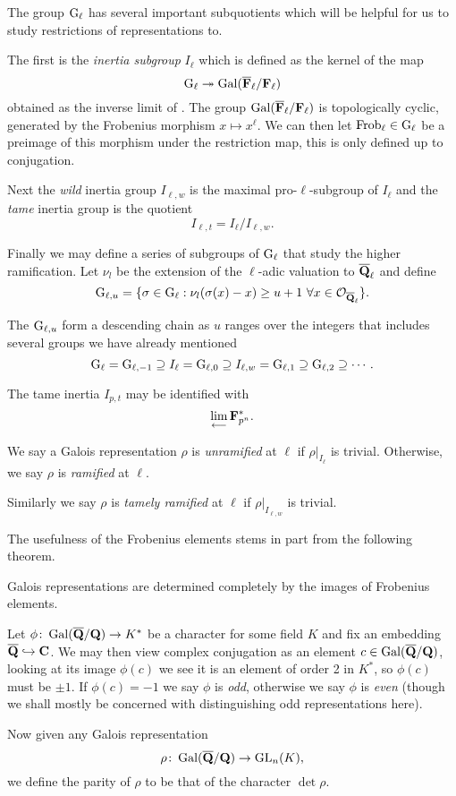 \documentclass[a4paper,12pt]{article}
\begin{document}
The group $\mathrm{G}_\ell$ has several important subquotients which will be helpful for us to study restrictions of representations to.
\begin{defn}\label{def:inert}
The first is the \emph{inertia subgroup} $I_\ell$ which is defined as the kernel of the map
\[
\mathrm{G}_\ell \twoheadrightarrow \operatorname{Gal}(\overline{\mathbf{F}}_\ell/\mathbf{F}_\ell)
\]
obtained as the inverse limit of . %
The group $\operatorname{Gal}(\overline{\mathbf{F}}_\ell/\mathbf{F}_\ell)$ is topologically cyclic, generated by the Frobenius morphism $x \mapsto x^\ell$.
We can then let $\operatorname{Frob}_\ell\in \mathrm{G}_\ell$ be a preimage of this morphism under the restriction map, this is only defined up to conjugation.


Next the \emph{wild} inertia group $I_{\ell,w}$ is the maximal pro-$\ell$-subgroup of $I_\ell$ and the \emph{tame} inertia group is the quotient
\[
I_{\ell,t} = I_\ell / I_{\ell,w}.
\]

Finally we may define a series of subgroups of $\mathrm{G}_\ell$ that study the higher ramification.
Let $\nu_l$ be the extension of the $\ell$-adic valuation to $\overline{\mathbf{Q}}_\ell$ and define
\[
\mathrm{G}_{\ell,u} = \{\sigma \in \mathrm{G}_\ell : \nu_l(\sigma(x) - x) \ge u + 1\ \forall x \in \mathcal{O}_{\overline{\mathbf{Q}}_\ell} \}.
\]
\end{defn}

The $\mathrm{G}_{\ell,u}$ form a descending chain as $u$ ranges over the integers that includes several groups we have already mentioned
\[
\mathrm{G}_\ell = \mathrm{G}_{\ell,-1} \supseteq I_\ell = \mathrm{G}_{\ell,0} \supseteq  I_{\ell,w} = \mathrm{G}_{\ell,1} \supseteq\mathrm{G}_{\ell, 2}\supseteq\cdots.
\]

The tame inertia $I_{p,t}$ may be identified with
\[
\lim_{\longleftarrow} \mathbf{F}_{p^n}^*.
\] %

\begin{defn}
We say a Galois representation $\rho$ is \emph{unramified} at $\ell$ if $\rho|_{I_\ell}$ is trivial.
Otherwise, we say $\rho$ is \emph{ramified} at $\ell$.

Similarly we say $\rho$ is \emph{tamely ramified} at $\ell$ if $\rho|_{I_{\ell,w}}$ is trivial.
\end{defn}

The usefulness of the Frobenius elements stems in part from the following theorem.

\begin{thm}\label{thm:cheb}
Galois representations are determined completely by the images of Frobenius elements.
\end{thm}

\begin{defn}
Let $\phi\colon\operatorname{Gal}(\overline{\mathbf{Q}}/\mathbf{Q}) \to K^*$ be a character for some field $K$ and fix an embedding $\overline{\mathbf{Q}}\hookrightarrow \mathbf{C}$.
We may then view complex conjugation as an element $c\in \operatorname{Gal}(\overline{\mathbf{Q}}/\mathbf{Q})$, looking at its image $\phi(c)$ we see it is an element of order 2 in $K^*$, so $\phi(c)$ must be $\pm 1$.
If $\phi(c) = -1$ we say $\phi$ is \emph{odd}, otherwise we say $\phi$ is \emph{even} (though we shall mostly be concerned with distinguishing odd representations here).

Now given any Galois representation
\[
\rho\colon\operatorname{Gal}(\overline{\mathbf{Q}}/\mathbf{Q}) \to \operatorname{GL}_n(K),
\]
we define the parity of $\rho$ to be that of the character $\det\rho$.
\end{defn}
\end{document}
